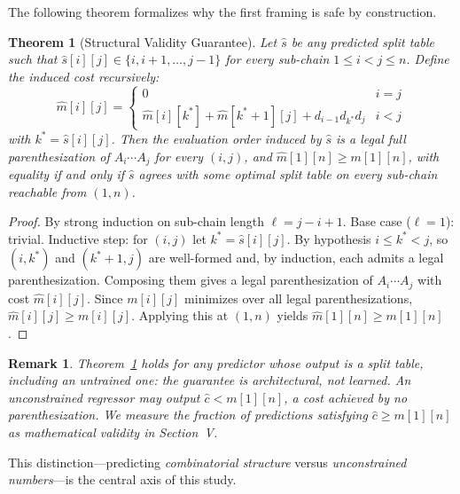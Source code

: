 \documentclass[conference]{IEEEtran}
\newtheorem{theorem}{Theorem}
\newtheorem{remark}{Remark}
\begin{document}
The following theorem formalizes why the first framing is safe by construction.

\begin{theorem}[Structural Validity Guarantee]
\label{thm:validity}
Let $\hat{s}$ be any predicted split table such that
$\hat{s}[i][j] \in \{i, i{+}1, \ldots, j{-}1\}$ for every sub-chain
$1 \le i < j \le n$. Define the induced cost recursively:
\begin{equation}
\hat{m}[i][j] =
\begin{cases}
0 & i = j\\
\hat{m}[i][k^*] + \hat{m}[k^*{+}1][j] + d_{i-1} d_{k^*} d_j & i < j
\end{cases}
\end{equation}
with $k^* = \hat{s}[i][j]$. Then the evaluation order induced by $\hat{s}$ is a
legal full parenthesization of $A_i \cdots A_j$ for every $(i,j)$, and
$\hat{m}[1][n] \ge m[1][n]$, with equality if and only if $\hat{s}$ agrees with
some optimal split table on every sub-chain reachable from $(1,n)$.
\end{theorem}

\begin{proof}
By strong induction on sub-chain length $\ell = j - i + 1$. Base case
($\ell{=}1$): trivial. Inductive step: for $(i,j)$ let $k^* = \hat{s}[i][j]$.
By hypothesis $i \le k^* < j$, so $(i,k^*)$ and $(k^*{+}1,j)$ are well-formed
and, by induction, each admits a legal parenthesization. Composing them gives a
legal parenthesization of $A_i \cdots A_j$ with cost $\hat{m}[i][j]$. Since
$m[i][j]$ minimizes over all legal parenthesizations, $\hat{m}[i][j] \ge m[i][j]$.
Applying this at $(1,n)$ yields $\hat{m}[1][n] \ge m[1][n]$.
\end{proof}

\begin{remark}
Theorem~\ref{thm:validity} holds for \emph{any} predictor whose output is a split
table, including an untrained one: the guarantee is architectural, not learned. An
unconstrained regressor may output $\hat{c} < m[1][n]$, a cost achieved by no
parenthesization. We measure the fraction of predictions satisfying
$\hat{c} \ge m[1][n]$ as \emph{mathematical validity} in Section~V.
\end{remark}

This distinction---predicting \emph{combinatorial structure} versus
\emph{unconstrained numbers}---is the central axis of this study.


\end{document}
